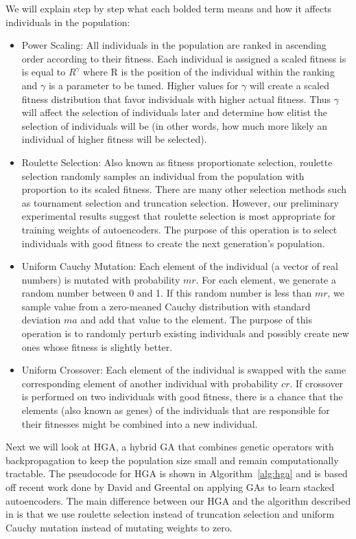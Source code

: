 We will explain step by step what each bolded term means and how it affects individuals in the population:

\begin{itemize}
  \item Power Scaling: All individuals in the population are ranked in ascending order according to their fitness. Each individual is assigned a scaled fitness is is equal to $R^{\gamma}$ where R is the position of the individual within the ranking and $\gamma$ is a parameter to be tuned. Higher values for $\gamma$ will create a scaled fitness distribution that favor individuals with higher actual fitness. Thus $\gamma$ will affect the selection of individuals later and determine how elitist the selection of individuals will be (in other words, how much more likely an individual of higher fitness will be selected).
  \item Roulette Selection: Also known as fitness proportionate selection, roulette selection randomly samples an individual from the population with proportion to its scaled fitness. There are many other selection methods such as tournament selection and truncation selection. However, our preliminary experimental results suggest that roulette selection is most appropriate for training weights of autoencoders. The purpose of this operation is to select individuals with good fitness to create the next generation's population. 
  \item Uniform Cauchy Mutation: Each element of the individual (a vector of real numbers) is mutated with probability $mr$. For each element, we generate a random number between 0 and 1. If this random number is less than $mr$, we sample value from a zero-meaned Cauchy distribution with standard deviation $ma$ and add that value to the element. The purpose of this operation is to randomly perturb existing individuals and possibly create new ones whose fitness is slightly better. 
  \item Uniform Crossover: Each element of the individual is swapped with the same corresponding element of another individual with probability $cr$. If crossover is performed on two individuals with good fitness, there is a chance that the elements (also known as genes) of the individuals that are responsible for their fitnesses might be combined into a new individual. 
\end{itemize}

Next we will look at HGA, a hybrid GA that combines genetic operators with backpropagation to keep the population size small and remain computationally tractable. The pseudocode for HGA is shown in Algorithm~\ref{alg:hga} and is based off recent work done by David and Greental \cite{david2014genetic} on applying GAs to learn stacked autoencoders. The main difference between our HGA and the algorithm described in \cite{david2014genetic} is that we use roulette selection instead of truncation selection and uniform Cauchy mutation instead of mutating weights to zero.

